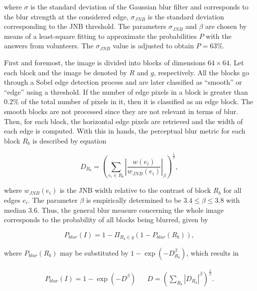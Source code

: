 \noindent where $\sigma$ is the standard deviation of the Gaussian blur filter and corresponds to the blur strength at the considered edge, $\sigma_{JNB}$ is the standard deviation corresponding to the JNB threshold. The parameters $\sigma_{JNB}$ and $\beta$ are chosen by means of a least-square fitting to approximate the probabilities $P$ with the answers from volunteers. The $\sigma_{JNB}$ value is adjusted to obtain $P = 63\%$.

First and foremost, the image is divided into blocks of dimensions $64 \times 64$. Let each block and the image be denoted by $R$ and $g$, respectively. All the blocks go through a Sobel edge detection process and are later classified as “smooth” or “edge” using a threshold. If the number of edge pixels in a block is greater than $0.2\%$ of the total number of pixels in it, then it is classified as an edge block. The smooth blocks are not processed since they are not relevant in terms of blur. Then, for each block, the horizontal edge pixels are retrieved and the width of each edge is computed. With this in hands, the perceptual blur metric for each block $R_{b}$ is described by equation 

\begin{equation}
\label{eqn:perceptual_blur_metric}
D_{R_{b}} = \left(
\sum_{e_{i} \in R_{b}}
\left|
\frac{w(e_{i})}{w_{JNB}(e_{i})}
\right|_{\beta}
\right)^{\frac{1}{\beta}},
\end{equation}

\noindent where $w_{JNB}(e_{i})$ is the JNB width relative to the contrast of block $R_{b}$ for all edges $e_{i}$. The parameter $\beta$ is empirically determined to be $3.4 \leq \beta \leq 3.8$ with median $3.6$. Thus, the general blur measure concerning the whole image corresponds to the probability of all blocks being blurred, given by

\begin{equation}
\label{eqn:p_blur}
    P_{blur}(I) = 1 - \Pi_{R_{b} \in g}
    \left(
    1 - P_{blur}(R_{b})
    \right),
\end{equation}

\noindent where $P_{blur}(R_{b})$ may be substituted by $1 - \exp{\left(-D_{R_{b}}^{\beta} \right)}$, which results in

\begin{align}
\label{eqn:p_blur_final}
    P_{blur}(I) = 1 - \exp{\left(-D^{\beta}\right)}
&&
D = \left(
    \sum_{R_{b}}
    \left|D_{R_{b}}
    \right|^{\beta}
    \right)^{\frac{1}{\beta}}.
\end{align}

